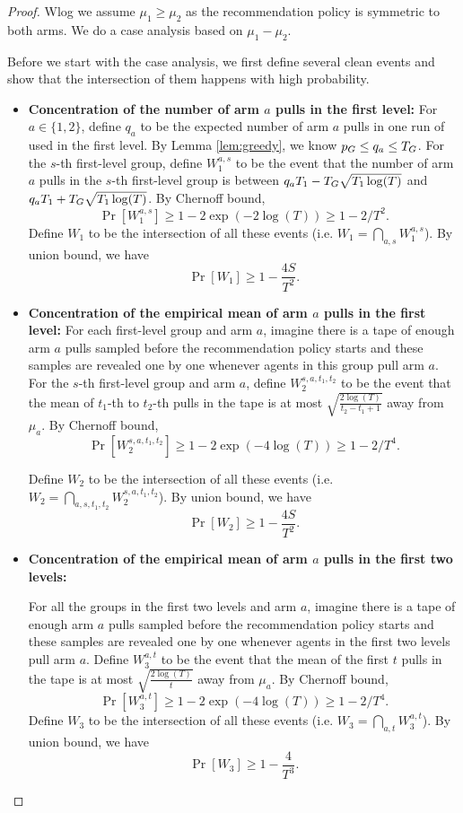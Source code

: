 \begin{proof}
Wlog we assume $\mu_1 \geq \mu_2$ as the recommendation policy is symmetric to both arms. We do a case analysis based on $\mu_1-\mu_2$. 

Before we start with the case analysis, we first define several clean events and show that the intersection of them happens with high probability. 
\begin{itemize}
\item \textbf{Concentration of the number of arm $a$ pulls in the first level:} 
For $a \in \{1,2\}$, define $q_a$ to be the expected number of arm $a$ pulls in one run of \ALGG used in the first level. By Lemma \ref{lem:greedy}, we know $p_G \leq q_a \leq T_G$. For the $s$-th first-level group, define $W_1^{a,s}$ to be the event that the number of arm $a$ pulls in the $s$-th first-level group is between $q_a T_1- T_G \sqrt{T_1\log(T)}$ and $q_a T_1 + T_G \sqrt{T_1\log(T)}$. By Chernoff bound,
\[
\Pr[W_1^{a,s}] \geq 1-2\exp(-2\log(T)) \geq 1-2/T^2.
\]
Define $W_1$ to be the intersection of all these events (i.e. $W_1 = \bigcap_{a,s}W_1^{a,s}$). By union bound, we have
\[
\Pr[W_1] \geq 1- \frac{4S}{T^2}.
\]
\item \textbf{Concentration of the empirical mean of arm $a$ pulls in the first level:}
For each first-level group and arm $a$, imagine there is a tape of enough arm $a$ pulls sampled before the recommendation policy starts and these samples are revealed one by one whenever agents in this group pull arm $a$. For the $s$-th first-level group and arm $a$, define $W_2^{s,a,t_1,t_2}$ to be the event that the mean of $t_1$-th to $t_2$-th pulls in the tape is at most $\sqrt{\frac{2\log(T)}{t_2-t_1+1}}$ away from $\mu_a$. By Chernoff bound, 
\[
\Pr[W_2^{s,a,t_1,t_2}] \geq 1 - 2\exp(-4\log(T)) \geq 1- 2/T^4.
\]

Define $W_2$ to be the intersection of all these events (i.e. $W_2 = \bigcap_{a,s,t_1,t_2} W_2^{s,a,t_1,t_2}$). By union bound, we have
\[
\Pr[W_2] \geq 1- \frac{4S}{T^2}.
\]

\item \textbf{Concentration of the empirical mean of arm $a$ pulls in the first two levels:}

For all the groups in the first two levels and arm $a$, imagine there is a tape of enough arm $a$ pulls sampled before the recommendation policy starts and these samples are revealed one by one whenever agents in the first two levels pull arm $a$. Define $W_3^{a,t}$ to be the event that the mean of the first $t$ pulls in the tape is at most $\sqrt{\frac{2\log(T)}{t}}$ away from $\mu_a$. By Chernoff bound, 
\[
\Pr[W_3^{a,t}] \geq 1 - 2\exp(-4\log(T)) \geq 1- 2/T^4.
\]
Define $W_3$ to be the intersection of all these events (i.e. $W_3 = \bigcap_{a,t} W_3^{a,t}$). By union bound, we have
\[
\Pr[W_3] \geq 1- \frac{4}{T^3}.
\]


\end{itemize}
\end{proof}
